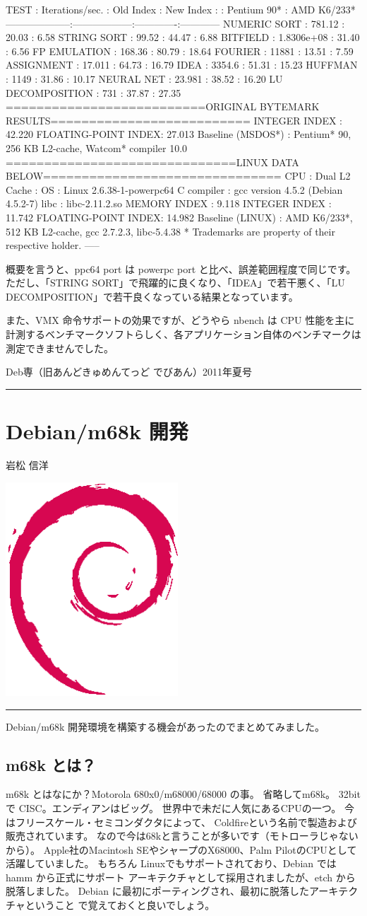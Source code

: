 \documentclass[mingoth,a4paper]{jsarticle}
\renewcommand{\dancersection}[2]{%
\newpage
Deb専（旧あんどきゅめんてっど でびあん）2011年夏号
%
\vspace{0.1mm}\\
{\color{dancerdarkblue}\rule{\hsize}{2mm}}

%
%
\begin{minipage}[t]{0.6\hsize}
\color{dancerdarkblue}
\vspace{1cm}
\section{#1}
\hfill{}#2\\
\end{minipage}
\begin{minipage}[t]{0.4\hsize}
\vspace{-2cm}
\hfill{}\includegraphics[height=8cm]{image200502/openlogo-nd.eps}\\
\vspace{-5cm}
\end{minipage}
%
{\color{dancerlightblue}\rule{0.66\hsize}{2mm}}
%
\vspace{2cm}
}
\begin{document}
\begin{commandline}
TEST                : Iterations/sec.  : Old Index   : New Index
                    :                  : Pentium 90* : AMD K6/233*
--------------------:------------------:-------------:------------
NUMERIC SORT        :          781.12  :      20.03  :       6.58
STRING SORT         :           99.52  :      44.47  :       6.88
BITFIELD            :      1.8306e+08  :      31.40  :       6.56
FP EMULATION        :          168.36  :      80.79  :      18.64
FOURIER             :           11881  :      13.51  :       7.59
ASSIGNMENT          :          17.011  :      64.73  :      16.79
IDEA                :          3354.6  :      51.31  :      15.23
HUFFMAN             :            1149  :      31.86  :      10.17
NEURAL NET          :          23.981  :      38.52  :      16.20
LU DECOMPOSITION    :             731  :      37.87  :      27.35
==========================ORIGINAL BYTEMARK RESULTS==========================
INTEGER INDEX       : 42.220
FLOATING-POINT INDEX: 27.013
Baseline (MSDOS*)   : Pentium* 90, 256 KB L2-cache, Watcom* compiler 10.0
==============================LINUX DATA BELOW===============================
CPU                 : Dual
L2 Cache            :
OS                  : Linux 2.6.38-1-powerpc64
C compiler          : gcc version 4.5.2 (Debian 4.5.2-7)
libc                : libc-2.11.2.so
MEMORY INDEX        : 9.118
INTEGER INDEX       : 11.742
FLOATING-POINT INDEX: 14.982
Baseline (LINUX)    : AMD K6/233*, 512 KB L2-cache, gcc 2.7.2.3, libc-5.4.38
* Trademarks are property of their respective holder.
-----
\end{commandline}

概要を言うと、ppc64 port は powerpc port と比べ、誤差範囲程度で同じです。
ただし、「STRING SORT」で飛躍的に良くなり、「IDEA」で若干悪く、「LU DECOMPOSITION」で若干良くなっている結果となっています。

また、VMX 命令サポートの効果ですが、どうやら nbench は CPU 性能を主に計測するベンチマークソフトらしく、各アプリケーション自体のベンチマークは測定できませんでした。




\dancersection{Debian/m68k 開発}{岩松 信洋}

Debian/m68k 開発環境を構築する機会があったのでまとめてみました。

\subsection{m68k とは？}
m68k とはなにか？Motorola 680x0/m68000/68000 の事。
省略してm68k。
32bit で CISC。エンディアンはビッグ。
世界中で未だに人気にあるCPUの一つ。
今はフリースケール・セミコンダクタによって、
Coldfireという名前で製造および販売されています。
なので今は68kと言うことが多いです（モトローラじゃないから）。
Apple社のMacintosh SEやシャープのX68000、Palm PilotのCPUとして活躍していました。
もちろん Linuxでもサポートされており、Debian では hamm から正式にサポート
アーキテクチャとして採用されましたが、etch から脱落しました。
Debian に最初にポーティングされ、最初に脱落したアーキテクチャということ
で覚えておくと良いでしょう。
\end{document}
